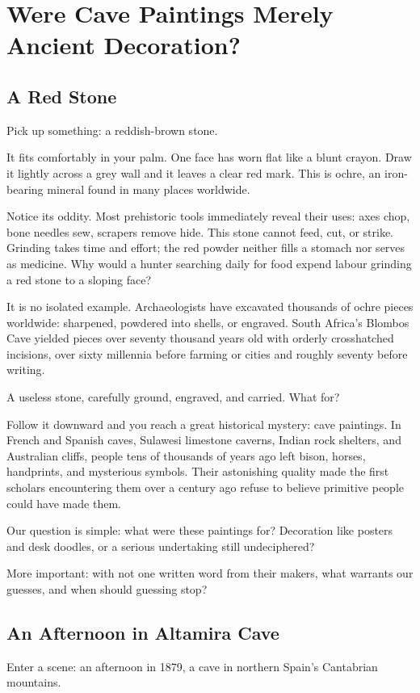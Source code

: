 \chapter[Were Cave Paintings Just Decoration?]{Were Cave Paintings Merely Ancient Decoration?}
\section{A Red Stone}
Pick up something: a reddish-brown stone.

It fits comfortably in your palm. One face has worn flat like a blunt crayon. Draw it lightly across a grey wall and it leaves a clear red mark. This is ochre, an iron-bearing mineral found in many places worldwide.

Notice its oddity. Most prehistoric tools immediately reveal their uses: axes chop, bone needles sew, scrapers remove hide. This stone cannot feed, cut, or strike. Grinding takes time and effort; the red powder neither fills a stomach nor serves as medicine. Why would a hunter searching daily for food expend labour grinding a red stone to a sloping face?

It is no isolated example. Archaeologists have excavated thousands of ochre pieces worldwide: sharpened, powdered into shells, or engraved. South Africa's Blombos Cave yielded pieces over seventy thousand years old with orderly crosshatched incisions, over sixty millennia before farming or cities and roughly seventy before writing.

A useless stone, carefully ground, engraved, and carried. What for?

Follow it downward and you reach a great historical mystery: cave paintings. In French and Spanish caves, Sulawesi limestone caverns, Indian rock shelters, and Australian cliffs, people tens of thousands of years ago left bison, horses, handprints, and mysterious symbols. Their astonishing quality made the first scholars encountering them over a century ago refuse to believe primitive people could have made them.

Our question is simple: what were these paintings for? Decoration like posters and desk doodles, or a serious undertaking still undeciphered?

More important: with not one written word from their makers, what warrants our guesses, and when should guessing stop?

\section{An Afternoon in Altamira Cave}
Enter a scene: an afternoon in 1879, a cave in northern Spain's Cantabrian mountains.

